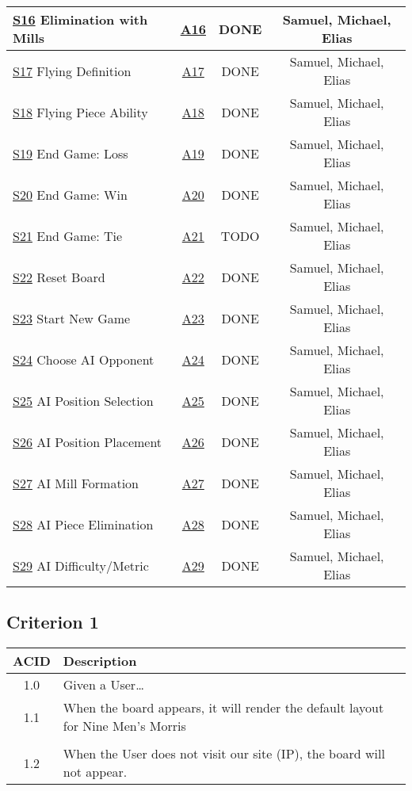 \documentclass[11pt]{article}
\begin{document}
\begin{center}
\begin{tabular}{|l|c|c|c|}
\hline
\hyperref[sec:orgeab77bb]{S16} Elimination with Mills & \hyperref[sec:org373589c]{A16} & DONE & Samuel, Michael, Elias\\
\hline
\hyperref[sec:org488bf16]{S17} Flying Definition & \hyperref[sec:org68f1de9]{A17} & DONE & Samuel, Michael, Elias\\
\hline
\hyperref[sec:orgf90a935]{S18} Flying Piece Ability & \hyperref[sec:orgb83108f]{A18} & DONE & Samuel, Michael, Elias\\
\hline
\hyperref[sec:org62411b7]{S19} End Game: Loss & \hyperref[sec:orgf4bdeff]{A19} & DONE & Samuel, Michael, Elias\\
\hline
\hyperref[sec:org32956f8]{S20} End Game: Win & \hyperref[sec:org83de2ef]{A20} & DONE & Samuel, Michael, Elias\\
\hline
\hyperref[sec:orgbe95978]{S21} End Game: Tie & \hyperref[sec:org4b5f4d6]{A21} & TODO & Samuel, Michael, Elias\\
\hline
\hyperref[sec:org5e90d2f]{S22} Reset Board & \hyperref[sec:orge0a2205]{A22} & DONE & Samuel, Michael, Elias\\
\hline
\hyperref[sec:orgc7da472]{S23} Start New Game & \hyperref[sec:org11d6adf]{A23} & DONE & Samuel, Michael, Elias\\
\hline
\hyperref[sec:org7f9a07f]{S24} Choose AI Opponent & \hyperref[sec:orga442703]{A24} & DONE & Samuel, Michael, Elias\\
\hline
\hyperref[sec:org5cd5738]{S25} AI Position Selection & \hyperref[sec:org67d882b]{A25} & DONE & Samuel, Michael, Elias\\
\hline
\hyperref[sec:orgca7949c]{S26} AI Position Placement & \hyperref[sec:org3fd669d]{A26} & DONE & Samuel, Michael, Elias\\
\hline
\hyperref[sec:orga31eb98]{S27} AI Mill Formation & \hyperref[sec:org2018ffd]{A27} & DONE & Samuel, Michael, Elias\\
\hline
\hyperref[sec:org589ee2d]{S28} AI Piece Elimination & \hyperref[sec:orgdd66f50]{A28} & DONE & Samuel, Michael, Elias\\
\hline
\hyperref[sec:org4e32353]{S29} AI Difficulty/Metric & \hyperref[sec:org1bb595a]{A29} & DONE & Samuel, Michael, Elias\\
\end{tabular}
\end{center}

\subsection{Criterion 1}
\label{sec:org5423200}
\begin{center}
\begin{tabular}{|c|p{12.0cm}|}
ACID & Description\\
\hline
1.0 & Given a User\ldots{}\\
\hline
1.1 & When the board appears, it will render the default layout for Nine Men's Morris\\
 & \\
1.2 & When the User does not visit our site (IP), the board will not appear.\\
\end{tabular}
\end{center}
\end{document}
